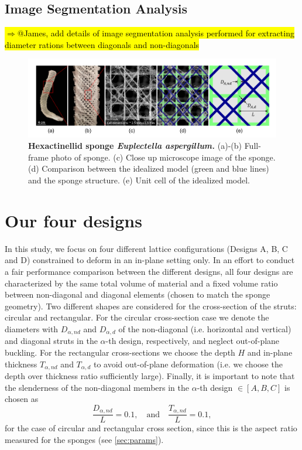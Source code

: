 \documentclass[10pt,twoside]{fernandes_supp}
\newcommand{\mf}[1]{\noindent\color{color2}\sethlcolor{cyan}\hl{$\Longrightarrow$#1}\normalcolor}
\begin{document}
\subsection{Image Segmentation Analysis}
\mf{@James, add details of image segmentation analysis performed for extracting diameter rations between diagonals and non-diagonals}

\begin{figure}
    \centering
    \includegraphics[width=0.9\linewidth]{SFig1.png}
    \caption{\textbf{Hexactinellid sponge \textit{Euplectella aspergillum.}} (a)-(b) Full-frame photo of sponge.  (c)  Close up microscope image of the sponge. (d) Comparison between the idealized model (green and blue lines) and the sponge structure. (e) Unit cell of the idealized model.}
    \label{Sponge}
\end{figure}

\section{Our four designs}\label{sec:designs}
In this study, we focus on four different lattice configurations (Designs A, B, C and D) constrained to deform in an in-plane setting only. In an effort to conduct a fair performance comparison between the different designs, all four designs are characterized by the same total volume of material and a fixed volume ratio between non-diagonal and diagonal elements (chosen to match the sponge geometry).  Two different shapes are considered for the cross-section of the struts: circular and rectangular.  For the circular cross-section case  we denote the diameters with $D_{\alpha,nd}$ and $D_{\alpha,d}$ of the non-diagonal (i.e. horizontal and vertical) and diagonal struts in the $\alpha$-th design, respectively, and neglect out-of-plane buckling. For the rectangular cross-sections we choose the depth $H$ and in-plane thickness $T_{\alpha,nd}$ and $T_{\alpha,d}$  to avoid out-of-plane deformation (i.e. we choose the  depth over thickness ratio sufficiently large). Finally, it is important to note that the slenderness of the non-diagonal members in the $\alpha$-th design $\in [A,B,C]$ is chosen as 
\begin{equation}
\frac{D_{\alpha,nd}}{L}=0.1,\quad\text{and}\quad\frac{T_{\alpha,nd}}{L}=0.1,
\end{equation}
for the case of circular and rectangular cross section, since this is the aspect ratio measured for the sponges (see \cref{sec:params}).
\end{document}
